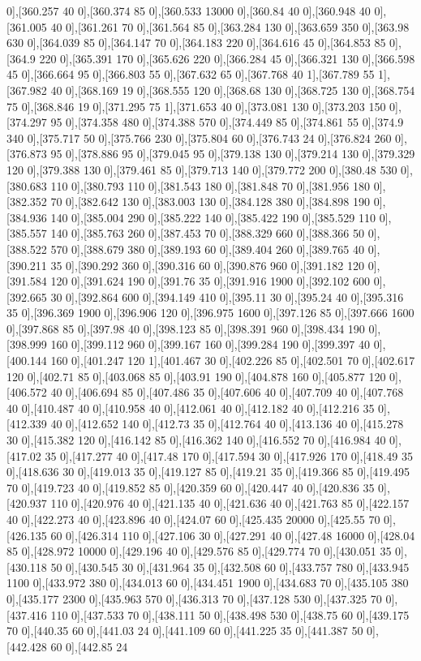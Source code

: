 {0],[360.257 40 0],[360.374 85 0],[360.533 13000 0],[360.84 40 0],[360.948 40 0],[361.005 40 0],[361.261 70 0],[361.564 85 0],[363.284 130 0],[363.659 350 0],[363.98 630 0],[364.039 85 0],[364.147 70 0],[364.183 220 0],[364.616 45 0],[364.853 85 0],[364.9 220 0],[365.391 170 0],[365.626 220 0],[366.284 45 0],[366.321 130 0],[366.598 45 0],[366.664 95 0],[366.803 55 0],[367.632 65 0],[367.768 40 1],[367.789 55 1],[367.982 40 0],[368.169 19 0],[368.555 120 0],[368.68 130 0],[368.725 130 0],[368.754 75 0],[368.846 19 0],[371.295 75 1],[371.653 40 0],[373.081 130 0],[373.203 150 0],[374.297 95 0],[374.358 480 0],[374.388 570 0],[374.449 85 0],[374.861 55 0],[374.9 340 0],[375.717 50 0],[375.766 230 0],[375.804 60 0],[376.743 24 0],[376.824 260 0],[376.873 95 0],[378.886 95 0],[379.045 95 0],[379.138 130 0],[379.214 130 0],[379.329 120 0],[379.388 130 0],[379.461 85 0],[379.713 140 0],[379.772 200 0],[380.48 530 0],[380.683 110 0],[380.793 110 0],[381.543 180 0],[381.848 70 0],[381.956 180 0],[382.352 70 0],[382.642 130 0],[383.003 130 0],[384.128 380 0],[384.898 190 0],[384.936 140 0],[385.004 290 0],[385.222 140 0],[385.422 190 0],[385.529 110 0],[385.557 140 0],[385.763 260 0],[387.453 70 0],[388.329 660 0],[388.366 50 0],[388.522 570 0],[388.679 380 0],[389.193 60 0],[389.404 260 0],[389.765 40 0],[390.211 35 0],[390.292 360 0],[390.316 60 0],[390.876 960 0],[391.182 120 0],[391.584 120 0],[391.624 190 0],[391.76 35 0],[391.916 1900 0],[392.102 600 0],[392.665 30 0],[392.864 600 0],[394.149 410 0],[395.11 30 0],[395.24 40 0],[395.316 35 0],[396.369 1900 0],[396.906 120 0],[396.975 1600 0],[397.126 85 0],[397.666 1600 0],[397.868 85 0],[397.98 40 0],[398.123 85 0],[398.391 960 0],[398.434 190 0],[398.999 160 0],[399.112 960 0],[399.167 160 0],[399.284 190 0],[399.397 40 0],[400.144 160 0],[401.247 120 1],[401.467 30 0],[402.226 85 0],[402.501 70 0],[402.617 120 0],[402.71 85 0],[403.068 85 0],[403.91 190 0],[404.878 160 0],[405.877 120 0],[406.572 40 0],[406.694 85 0],[407.486 35 0],[407.606 40 0],[407.709 40 0],[407.768 40 0],[410.487 40 0],[410.958 40 0],[412.061 40 0],[412.182 40 0],[412.216 35 0],[412.339 40 0],[412.652 140 0],[412.73 35 0],[412.764 40 0],[413.136 40 0],[415.278 30 0],[415.382 120 0],[416.142 85 0],[416.362 140 0],[416.552 70 0],[416.984 40 0],[417.02 35 0],[417.277 40 0],[417.48 170 0],[417.594 30 0],[417.926 170 0],[418.49 35 0],[418.636 30 0],[419.013 35 0],[419.127 85 0],[419.21 35 0],[419.366 85 0],[419.495 70 0],[419.723 40 0],[419.852 85 0],[420.359 60 0],[420.447 40 0],[420.836 35 0],[420.937 110 0],[420.976 40 0],[421.135 40 0],[421.636 40 0],[421.763 85 0],[422.157 40 0],[422.273 40 0],[423.896 40 0],[424.07 60 0],[425.435 20000 0],[425.55 70 0],[426.135 60 0],[426.314 110 0],[427.106 30 0],[427.291 40 0],[427.48 16000 0],[428.04 85 0],[428.972 10000 0],[429.196 40 0],[429.576 85 0],[429.774 70 0],[430.051 35 0],[430.118 50 0],[430.545 30 0],[431.964 35 0],[432.508 60 0],[433.757 780 0],[433.945 1100 0],[433.972 380 0],[434.013 60 0],[434.451 1900 0],[434.683 70 0],[435.105 380 0],[435.177 2300 0],[435.963 570 0],[436.313 70 0],[437.128 530 0],[437.325 70 0],[437.416 110 0],[437.533 70 0],[438.111 50 0],[438.498 530 0],[438.75 60 0],[439.175 70 0],[440.35 60 0],[441.03 24 0],[441.109 60 0],[441.225 35 0],[441.387 50 0],[442.428 60 0],[442.85 24 }

